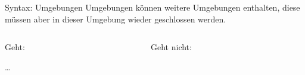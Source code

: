 \begin{frame}[fragile]{Syntax: Umgebungen}
    Umgebungen können weitere Umgebungen enthalten, diese müssen 
    aber in dieser Umgebung wieder geschlossen werden.
    \begin{columns}[t]
        \begin{column}{0.47\textwidth}
            \begin{block}{Geht:}
                \begin{lstverbatim}
                
                    \begin{flushright}
                        …
                    \end{flushright}
                
                \end{lstverbatim}
            \end{block}
        \end{column}
        \begin{column}{0.47\textwidth}
            \begin{alertblock}{Geht nicht:}
                \begin{lstverbatim}
                    \begin{itemize}
                        \begin{enumerate}
                    \end{itemize}
                        \end{enumerate}
                \end{lstverbatim}
            \end{alertblock}
        \end{column}
    \end{columns}
\end{frame}




